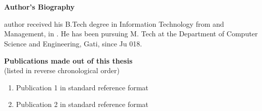 \chapter*{}
 \begin{center}
 {\Huge \bfseries Author's Biography}
 \vspace{1cm}
 \end{center}
 
 \onehalfspace
 \noindent author received his B.Tech  degree in Information Technology  from   and Management, in . He has been pursuing M. Tech at the Department of Computer Science and Engineering,  Gati, since Ju 018.
 
 \singlespace
 \begin{center}
 \vspace{0.3cm}
 {\bfseries {\large Publications made out of this thesis\\}}
 (listed in reverse chronological order)
 \vspace{0.3cm}
 \end{center}
 
 \begin{enumerate}
\item Publication 1 in standard reference format
\item Publication 2 in standard reference format

 	  
 \end{enumerate}
